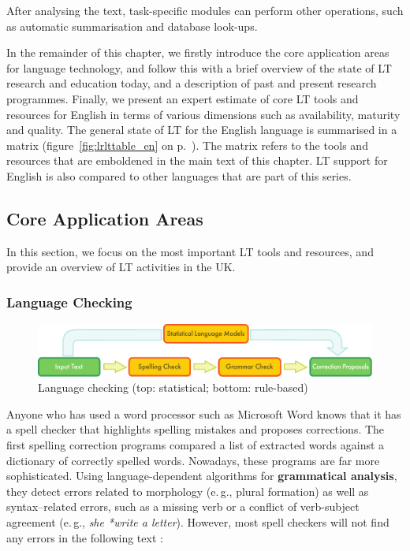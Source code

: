 \begin{multicols}{2}
After analysing the text, task-specific modules can perform other operations, such as automatic summarisation and database look-ups.

In the remainder of this chapter, we firstly introduce the core application areas for language technology, and follow this with a brief overview of the state of LT research and education today, and a description of past and present research programmes. Finally, we present an expert estimate of core LT tools and resources for English in terms of various dimensions such as availability, maturity and quality. The general state of LT for the English language is summarised in a matrix (figure~\ref{fig:lrlttable_en} on p.~\pageref{fig:lrlttable_en}). The matrix refers to the tools and resources that are emboldened in the main text of this chapter. LT support for English is also compared to other languages that are part of this series.

\subsection{Core Application Areas}

In this section, we focus on the most important LT tools and resources, and provide an overview of LT activities in the UK.

\subsubsection{Language Checking}

\begin{figure}[t]
  \center
  \includegraphics[width=\textwidth]{../_media/english/language_checking}
  \caption{Language checking (top: statistical; bottom: rule-based)}
  \label{fig:langcheckingaarch_en}
\end{figure}

Anyone who has used a word processor such as Microsoft Word knows that it has a spell checker that highlights spelling mistakes and proposes corrections. The first spelling correction programs compared a list of extracted words against a dictionary of correctly spelled words. Nowadays, these programs are far more sophisticated. Using language-dependent algorithms for \textbf{grammatical analysis}, they detect errors related to morphology (e.\,g., plural formation) as well as syntax–related errors, such as a missing verb or a conflict of verb-subject agreement (e.\,g., \textit{she *write a letter}). However, most spell checkers will not find any errors in the following text \cite{zar1}:


\end{multicols}
